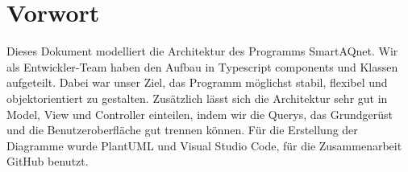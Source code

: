 \section{Vorwort}
Dieses Dokument modelliert die Architektur des Programms \gls{SmartAQnet}. Wir als Entwickler-Team haben den Aufbau in Typescript components und Klassen aufgeteilt. Dabei war unser Ziel, das Programm möglichst stabil, flexibel und objektorientiert zu gestalten. Zusätzlich lässt sich die Architektur sehr gut in Model, View und Controller einteilen, indem wir die Querys, das Grundgerüst und die Benutzeroberfläche gut trennen können. Für die Erstellung der Diagramme wurde PlantUML und Visual Studio Code, für die Zusammenarbeit GitHub benutzt.


